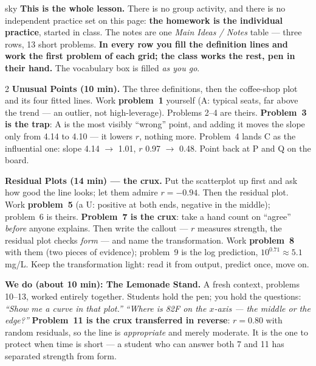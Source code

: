 \documentclass[10pt]{article}
\begin{document}
\boxguard
\begin{skillbox}{sky}
\textbf{This is the whole lesson.} There is no group activity, and there is no independent
practice set on this page: \textbf{the homework is the individual practice}, started in class.
The notes are one \emph{Main Ideas / Notes} table --- three rows, 13 short problems.
\textbf{In every row you fill the definition lines and work the first problem of each grid; the
class works the rest, pen in their hand.} The vocabulary box is filled \emph{as you go}.
\begin{multicols}{2}
\textbf{Unusual Points (10 min).} The three definitions, then the coffee-shop plot and its
four fitted lines. Work \textbf{problem~1} yourself (A: typical seats, far above the trend ---
an outlier, not high-leverage). Problems 2--4 are theirs. \textbf{Problem~3 is the trap}: A is
the most visibly ``wrong'' point, and adding it moves the slope only from 4.14 to 4.10 --- it
lowers $r$, nothing more. Problem~4 lands C as the influential one: slope 4.14 $\to$ 1.01,
$r$ 0.97 $\to$ 0.48. Point back at P and Q on the board.

\textbf{Residual Plots (14 min) --- the crux.} Put the scatterplot up first and ask how good
the line looks; let them admire $r = -0.94$. Then the residual plot. Work \textbf{problem~5}
(a U: positive at both ends, negative in the middle); problem~6 is theirs.
\textbf{Problem~7 is the crux}: take a hand count on ``agree'' \emph{before} anyone explains.
Then write the callout --- $r$ measures strength, the residual plot checks \emph{form} ---
and name the transformation. Work \textbf{problem~8} with them (two pieces of evidence);
problem~9 is the log prediction, $10^{0.71} \approx 5.1$ mg/L. Keep the transformation light:
read it from output, predict once, move on.

\columnbreak
\textbf{We do (about 10 min): The Lemonade Stand.} A fresh context, problems 10--13, worked
entirely together. Students hold the pen; you hold the questions: \emph{``Show me a curve in
that plot.''} \quad \emph{``Where is 82\textdegree F on the $x$-axis --- the middle or the
edge?''} \textbf{Problem~11 is the crux transferred in reverse}: $r = 0.80$ with random
residuals, so the line is \emph{appropriate} and merely moderate. It is the one to protect
when time is short --- a student who can answer both 7 and 11 has separated strength from form.


\end{multicols}
\end{skillbox}
\end{document}

